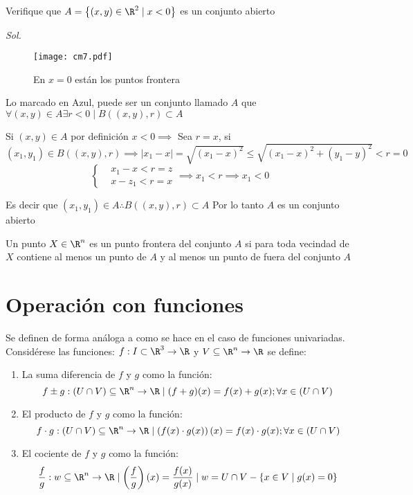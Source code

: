 \begin{example}
	Verifique que $A=\left\{(x,y)\in\R^2\mid x<0 \right\}$ es un conjunto abierto
\end{example}

\textit{ Sol. }

\begin{figure}[h!]
	\centering
	\texttt{[image: cm7.pdf]}
	\caption{En $x=0$ están los puntos frontera}
\end{figure}

Lo marcado en Azul, puede ser un conjunto llamado $A$ que $\forall(x,y)\in A\exists r<0\mid B\left((x,y),r\right)\subset A$

Si $(x,y)\in A$ por definición $x<0\implies$ Sea $r=x$, si $\left(x_1,y_1\right)\in B\left((x,y),r\right)\implies \left\lvert x_1-x\right\rvert=\sqrt{(x_1-x)^2}\leq \sqrt{(x_1-x)^2+(y_1-y)^2}<r=0$
\begin{equation*}
	\begin{cases}
		 & x_1-x<r=z \\
		 & x-z_1<r=x
	\end{cases}\implies x_1<r\implies x_1<0
\end{equation*}

Es decir que $(x_1,y_1)\in A\therefore B\left((x,y),r\right)\subset A$
Por lo tanto $A$ es un conjunto abierto

\begin{definition}
	Un punto $X\in \R^n$ es un punto frontera del conjunto $A$ si para toda
	vecindad de $X$ contiene al menos un punto de $A$ y al menos un punto de fuera del conjunto $A$
\end{definition}

\section{Operación con funciones}

Se definen de forma análoga a como se hace en el caso de funciones univariadas. Considérese las funciones:
$f:I\subset \R^3\to \R$ y $V\subseteq \R^n\to \R$ se define:

\begin{enumerate}
	\item La suma diferencia de $f$ y $g$ como la función:
	      \begin{equation}
		      f\pm g:(U\cap V)\subseteq \R^n\to \R\mid (f+g)(x)=f(x)+g(x);\forall x\in\left(U\cap V\right)
	      \end{equation}
	\item El producto de $f$ y $g$ como la función:
	      \begin{equation}
		      f\cdot g:\left(U\cap V\right)\subseteq \R^n\to \R\mid \left(f(x)\cdot g(x)\right)(x)=f(x)\cdot g(x);\forall x\in\left(U\cap V\right)
	      \end{equation}
	\item El cociente de $f$ y $g$ como la función:
	      \begin{equation}
		      \frac{f}{g}:w\subseteq \R^n\to \R\mid \left(\frac{f}{g}\right)(x)=\frac{f(x)}{g(x)}\mid w=U\cap V-\left\{x\in V\mid g(x)=0\right\}
	      \end{equation}
\end{enumerate}


